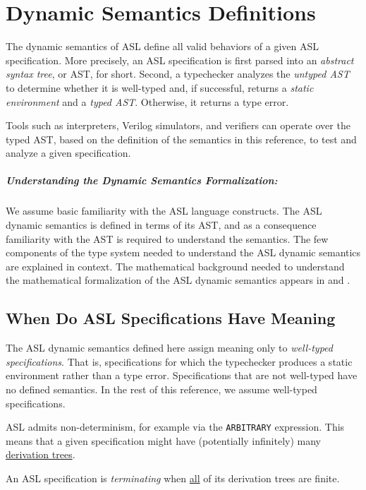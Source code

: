 \chapter{Dynamic Semantics Definitions\label{chap:Semantics}}

The dynamic semantics of ASL define all valid behaviors of a given ASL specification.
More precisely, an ASL specification is first parsed into an \emph{abstract syntax tree},
or AST, for short. Second, a typechecker analyzes the \emph{untyped AST} to determine whether it
is well-typed and, if successful, returns a \emph{static environment} and a \emph{typed AST}.
Otherwise, it returns a type error.

Tools such as interpreters, Verilog simulators, and verifiers can operate over the typed AST, based on the definition
of the semantics in this reference, to test and analyze a given specification.

\paragraph{Understanding the Dynamic Semantics Formalization:}
We assume basic familiarity with the ASL language constructs.
The ASL dynamic semantics is defined in terms of its AST,
and as a consequence familiarity with the AST is required to understand the semantics.
The few components of the type system needed to understand the ASL dynamic semantics are explained in context.
The mathematical background needed to understand the mathematical formalization
of the ASL dynamic semantics appears in  and .

\section{When Do ASL Specifications Have Meaning\label{sec:MeaningfulASLSpecifications}}
The ASL dynamic semantics defined here assign meaning only to \emph{well-typed specifications}.
That is, specifications for which the typechecker produces a static environment rather than
a type error.
Specifications that are not well-typed have no defined semantics.
In the rest of this reference, we assume well-typed specifications.

ASL admits non-determinism, for example via the \texttt{ARBITRARY} expression.
This means that a given specification might have (potentially infinitely) many
\hyperlink{def-derivationtree}{derivation trees}.

An ASL specification is \emph{terminating} when \underline{all} of its derivation trees are finite.

